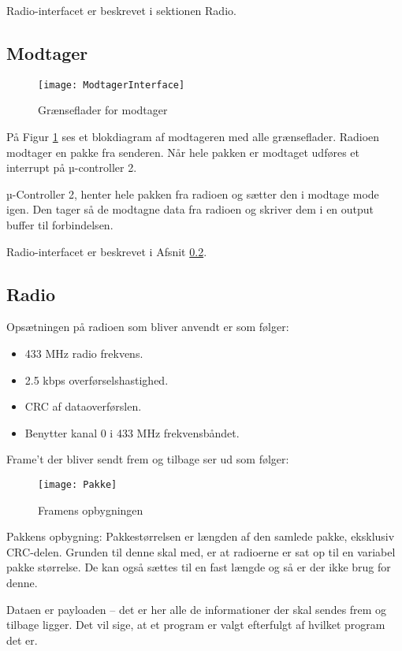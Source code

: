 \documentclass[Main]{subfiles}
\begin{document}
Radio-interfacet er beskrevet i sektionen Radio.



\subsection{Modtager}

\begin{figure}[H]
\centering
\texttt{[image: ModtagerInterface]}
\caption{Grænseflader for modtager}
\label{fig: ModtagerInterface}
\end{figure}
På Figur \ref{fig: ModtagerInterface} ses et blokdiagram af modtageren med alle grænseflader.
Radioen modtager en pakke fra senderen. Når hele pakken er modtaget udføres et interrupt på µ-controller 2.

µ-Controller 2, henter hele pakken fra radioen og sætter den i modtage mode igen. 
Den tager så de modtagne data fra radioen og skriver dem i en output buffer til \itoc forbindelsen.

Radio-interfacet er beskrevet i Afsnit \ref{Sec:Radio}.


\subsection{Radio} \label{Sec:Radio}
Opsætningen på radioen som bliver anvendt er som følger:
\begin{itemize}
\item 433 MHz radio frekvens.
\item 2.5 kbps overførselshastighed.
\item CRC af dataoverførslen.
\item Benytter kanal 0 i 433 MHz frekvensbåndet.
\end{itemize}


Frame't der bliver sendt frem og tilbage ser ud som følger:
\begin{figure}[H]
\centering
\texttt{[image: Pakke]}
\caption{Framens opbygningen}
\label{fig: Pakke}
\end{figure}

Pakkens opbygning:
Pakkestørrelsen er længden af den samlede pakke, eksklusiv CRC-delen. 
Grunden til denne skal med, er at radioerne er sat op til en variabel pakke størrelse. 
De kan også sættes til en fast længde og så er der ikke brug for denne.

Dataen er payloaden -- det er her alle de informationer der skal sendes frem og tilbage ligger. 
Det vil sige, at et program er valgt efterfulgt af hvilket program det er.
\end{document}
